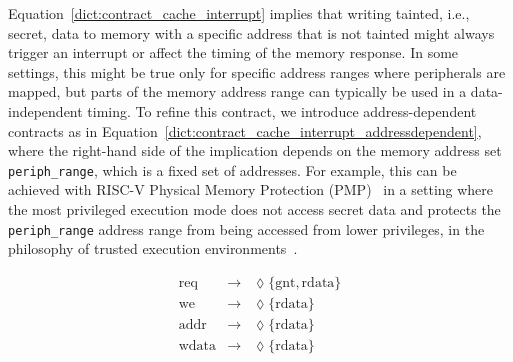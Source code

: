 Equation~\ref{dict:contract_cache_interrupt} implies that writing tainted, i.e., secret, data to memory with a specific address that is not tainted might always trigger an interrupt or affect the timing of the memory response. In some settings, this might be true only for specific address ranges where peripherals are mapped, but parts of the memory address range can typically be used in a data-independent timing.
To refine this contract, we introduce address-dependent contracts as in Equation~\ref{dict:contract_cache_interrupt_addressdependent}, where the right-hand side of the implication depends on the memory address set \texttt{periph\_range}, which is a fixed set of addresses.
For example, this can be achieved with RISC-V Physical Memory Protection (PMP)~\cite{riscv_privileged} in a setting where the most privileged execution mode does not access secret data and protects the \texttt{periph\_range} address range from being accessed from lower privileges, in the philosophy of trusted execution environments~\cite{lee2019keystone,costan2016sanctum,mckeen2013intel,arm2009trustzone,nasahl2020hector,mcgillion2015opentee,lebedev2018sanctorum,schneider2022sok,bourgeat2018mi6,brasser2022tcx}.


\begin{equation}
\label{dict:contract_nocache}
\begin{array}{rcl}
\text{req} & \rightarrow & \lozenge \{ \text{gnt}, \text{rdata}\} \\
\text{we} & \rightarrow & \lozenge \{\text{rdata}\} \\
\text{addr} & \rightarrow & \lozenge \{ \text{rdata}\} \\
\text{wdata} & \rightarrow & \lozenge \{ \text{rdata} \} \\
\end{array}
\end{equation}

